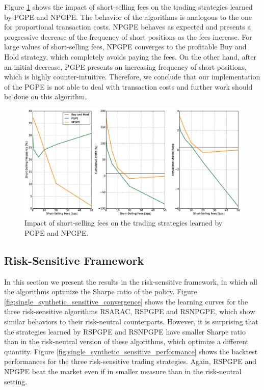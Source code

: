 Figure \ref{fig:impact_short_selling_fees} shows the impact of short-selling fees on the trading strategies learned by PGPE and NPGPE. The behavior of the algorithms is analogous to the one for proportional transaction costs. NPGPE behaves as expected and presents a progressive decrease of the frequency of short positions as the fees increase. For large values of short-selling fees, NPGPE converges to the profitable Buy and Hold strategy, which completely avoids paying the fees. On the other hand, after an initial decrease, PGPE presents an increasing frequency of short positions, which is highly counter-intuitive. Therefore, we conclude that our implementation of the PGPE is not able to deal with transaction costs and further work should be done on this algorithm.  
\begin{figure}[t!]
	\centering
	\includegraphics[width=1.0\textwidth]{Images/6_3_impact_short_selling_fees}
	\caption[Impact of short-selling fees]{Impact of short-selling fees on the trading strategies learned by PGPE and NPGPE.}
	\label{fig:impact_short_selling_fees}
\end{figure}

\subsection{Risk-Sensitive Framework}
In this section we present the results in the risk-sensitive framework, in which all the algorithms optimize the Sharpe ratio of the policy. Figure \ref{fig:single_synthetic_sensitive_convergence} shows the learning curves for the three risk-sensitive algorithms RSARAC, RSPGPE and RSNPGPE, which show similar behaviors to their risk-neutral counterparts. However, it is surprising that the strategies learned by RSPGPE and RSNPGPE have smaller Sharpe ratio than in the risk-neutral version of these algorithms, which optimize a different quantity. Figure \ref{fig:single_synthetic_sensitive_performance} shows the backtest performances for the three risk-sensitive trading strategies. Again, RSPGPE and NPGPE beat the market even if in smaller measure than in the risk-neutral setting. 

